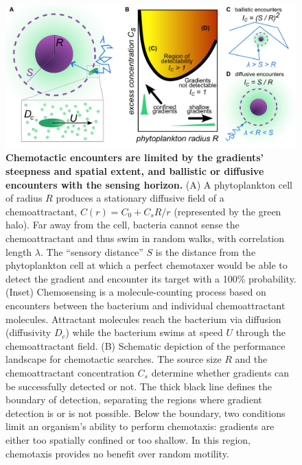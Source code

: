 \documentclass[9pt,twocolumn,twoside]{pnas-new}
\begin{document}
\begin{figure}
    \centering
    \includegraphics[width=17.8cm]{fig2_new.pdf}
    \caption{
        \textbf{
        Chemotactic encounters are limited by the gradients' steepness and spatial extent, and ballistic or diffusive encounters with the sensing horizon.
        }
        (A) A phytoplankton cell of radius $R$ produces a stationary diffusive field of a chemoattractant, $C(r) = C_0 + C_s R/r$ (represented by the green halo).
        Far away from the cell, bacteria cannot sense the chemoattractant and thus swim in random walks, with correlation length $\lambda$.
        The ``sensory distance'' $S$ is the distance from the phytoplankton cell at which a perfect chemotaxer would be able to detect the gradient and encounter its target with a 100\% probability.
        (Inset) Chemosensing is a molecule-counting process based on encounters between the bacterium and individual chemoattractant molecules.
        Attractant molecules reach the bacterium via diffusion (diffusivity $D_c$) while the bacterium swims at speed $U$ through the chemoattractant field.
        (B) Schematic depiction of the performance landscape for chemotactic searches.
        The source size $R$ and the chemoattractant concentration $C_s$ determine whether gradients can be successfully detected or not.
        The thick black line defines the boundary of detection, separating the regions where gradient detection is or is not possible.
        Below the boundary, two conditions limit an organism's ability to perform chemotaxis: gradients are either too spatially confined or too shallow. In this region, chemotaxis provides no benefit over random motility.
}
\end{figure}
\end{document}
